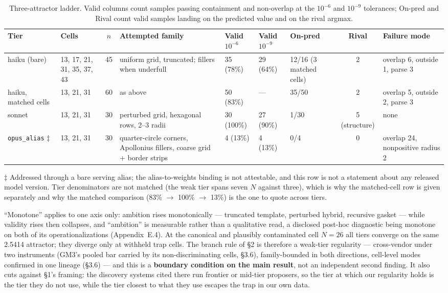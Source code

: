 \begin{table}[t]
\centering
\caption{Three-attractor ladder. Valid columns count samples passing containment and non-overlap at the $10^{-6}$ and $10^{-9}$ tolerances; On-pred and Rival count valid samples landing on the predicted value and on the rival argmax.}
\label{tab:ladder}
\footnotesize
\setlength{\tabcolsep}{4pt}
\begin{tabular}{@{}p{1.7cm}p{1.2cm}cp{2.2cm}p{1.0cm}p{1.0cm}p{1.5cm}cp{2.0cm}@{}}
\toprule
Tier & Cells & $n$ & Attempted family & Valid $10^{-6}$ & Valid $10^{-9}$ & On-pred & Rival & Failure mode \\
\midrule
haiku (bare) & 13, 17, 21, 31, 35, 37, 43 & 45 & uniform grid, truncated; fillers when underfull & 35 (78\%) & 29 (64\%) & 12/16 (3 matched cells) & 2 & overlap 6, outside 1, parse 3 \\
haiku, matched cells & 13, 21, 31 & 60 & as above & 50 (83\%) & --- & 35/50 & 2 & overlap 5, outside 2, parse 3 \\
sonnet & 13, 21, 31 & 30 & perturbed grid, hexagonal rows, 2--3 radii & 30 (100\%) & 27 (90\%) & 1/30 & 5 (structure) & none \\
\texttt{opus\_alias} $\ddagger$ & 13, 21, 31 & 30 & quarter-circle corners, Apollonius fillers, coarse grid + border strips & 4 (13\%) & 4 (13\%) & 0/4 & 0 & overlap 24, nonpositive radius 2 \\
\bottomrule
\end{tabular}
\end{table}

$\ddagger$ Addressed through a bare serving alias; the alias-to-weights binding is not attestable,
and this row is not a statement about any released model version. Tier denominators are not matched
(the weak tier spans seven $N$ against three), which is why the matched-cell row is given
separately and why the matched comparison (83\% $\rightarrow$ 100\% $\rightarrow$ 13\%) is the one to
quote across tiers.

``Monotone'' applies to one axis only: ambition rises monotonically --- truncated template,
perturbed hybrid, recursive gasket --- while validity rises then collapses, and ``ambition'' is
measurable rather than a qualitative read, a disclosed post-hoc diagnostic being monotone on both
of its operationalizations (Appendix~E.4). At the canonical and plausibly contaminated cell
$N = 26$ all tiers converge on the same 2.5414 attractor; they diverge only at withheld trap cells.
The branch rule of \S2 is therefore a weak-tier regularity --- cross-vendor under two instruments
(GM3's pooled bar carried by its non-discriminating cells, \S3.6),
family-bounded in both directions, cell-level modes confirmed in one lineage (\S3.6) --- and this
is a \textbf{boundary condition on the main result}, not an independent second finding. It also
cuts against \S1's framing: the discovery systems cited there run frontier or mid-tier proposers,
so the tier at which our regularity holds is the tier they do not use, while the tier closest to
what they use escapes the trap in our own data.

